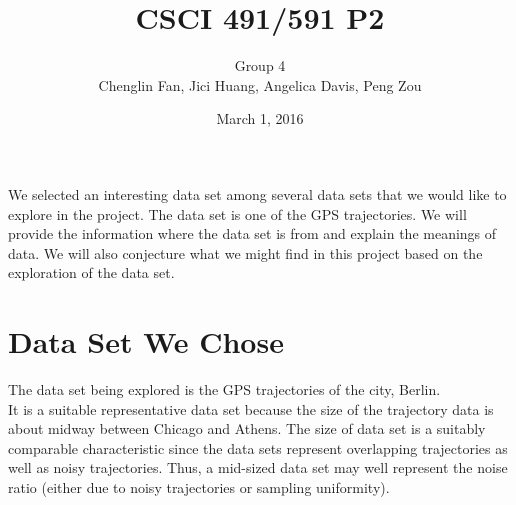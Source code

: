 \documentclass[11pt]{article}
\title{CSCI 491/591 P2}
\date{March 1, 2016}
\author{Group 4\\Chenglin Fan, Jici Huang,
Angelica Davis, Peng Zou}
\begin{document}
\maketitle
\noindent
We selected an interesting data set among several data sets
that we would like to explore in the project. The data set is one of the GPS trajectories. We will provide the information where the data set is from and explain the meanings of data. We will also conjecture what we might find in this project based on the exploration of the data set.
\section*{Data Set We Chose}
The data set being explored is the GPS trajectories of the city, Berlin. \\
It is a suitable representative data set because the size of the trajectory data is about midway between Chicago and Athens. The size of data set is a suitably comparable characteristic since the data sets represent overlapping trajectories as well as noisy trajectories. Thus, a mid-sized data set may well represent the noise ratio (either due to noisy trajectories or sampling uniformity).
\end{document}
